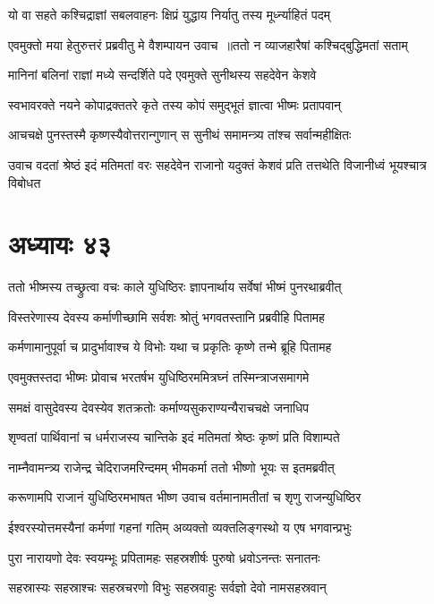 \twolineshloka
{यो वा सहते कश्चिद्राज्ञां सबलवाहनः}
{क्षिप्रं युद्धाय निर्यातु तस्य मूर्ध्न्याहितं पदम्}


\twolineshloka
{एवमुक्तो मया हेतुरुत्तरं प्रब्रवीतु मे}
{वैशम्पायन उवाच ॥ततो न व्याजहारैषां कश्चिद्बुद्धिमतां सताम्}


\twolineshloka
{मानिनां बलिनां राज्ञां मध्ये सन्दर्शिते पदे}
{एवमुक्ते सुनीथस्य सहदेवेन केशवे}


\twolineshloka
{स्वभावरक्ते नयने कोपाद्रक्ततरे कृते}
{तस्य कोपं समुद्भूतं ज्ञात्वा भीष्मः प्रतापवान्}


\twolineshloka
{आचचक्षे पुनस्तस्मै कृष्णस्यैवोत्तरान्गुणान्}
{स सुनीथं समामन्त्र्य तांश्च सर्वान्महीक्षितः}


\threelineshloka
{उवाच वदतां श्रेष्ठं इदं मतिमतां वरः}
{सहदेवेन राजानो यदुक्तं केशवं प्रति}
{तत्तथेति विजानीध्वं भूयश्चात्र विबोधत}


\chapter{अध्यायः ४३}
\twolineshloka
{ततो भीष्मस्य तच्छ्रुत्वा वचः काले युधिष्ठिरः}
{ज्ञापनार्थाय सर्वेषां भीष्मं पुनरथाब्रवीत्}


\twolineshloka
{विस्तरेणास्य देवस्य कर्माणीच्छामि सर्वशः}
{श्रोतुं भगवतस्तानि प्रब्रवीहि पितामह}


\twolineshloka
{कर्मणामानुपूर्वा च प्रादुर्भावाश्च ये विभोः}
{यथा च प्रकृतिः कृष्णे तन्मे ब्रूहि पितामह}


\twolineshloka
{एवमुक्तस्तदा भीष्मः प्रोवाच भरतर्षभ}
{युधिष्ठिरममित्रघ्नं तस्मिन्त्राजसमागमे}


\twolineshloka
{समक्षं वासुदेवस्य देवस्येव शतक्रतोः}
{कर्माण्यसुकराण्यन्यैराचचक्षे जनाधिप}


\twolineshloka
{शृण्वतां पार्थिवानां च धर्मराजस्य चान्तिके}
{इदं मतिमतां श्रेष्ठः कृष्णं प्रति विशाम्पते}


\twolineshloka
{नाम्नैवामन्त्र्य राजेन्द्र चेदिराजमरिन्दमम्}
{भीमकर्मा ततो भीष्णो भूयः स इतमब्रवीत्}


\threelineshloka
{करूणामपि राजानं युधिष्ठिरमभाषत}
{भीष्ण उवाच}
{वर्तमानामतीतां च शृणु राजन्युधिष्ठिर}


\twolineshloka
{ईश्वरस्योत्तमस्यैनां कर्मणां गहनां गतिम्}
{अव्यक्तो व्यक्तलिङ्गस्थो य एष भगवान्प्रभुः}


\twolineshloka
{पुरा नारायणो देवः स्वयम्भूः प्रपितामहः}
{सहस्रशीर्षः पुरुषो ध्रवोऽनन्तः सनातनः}


\twolineshloka
{सहस्रास्यः सहस्राश्चः सहस्रचरणो विभुः}
{सहस्रवाहुः सर्वज्ञो देवो नामसहस्रवान्}


